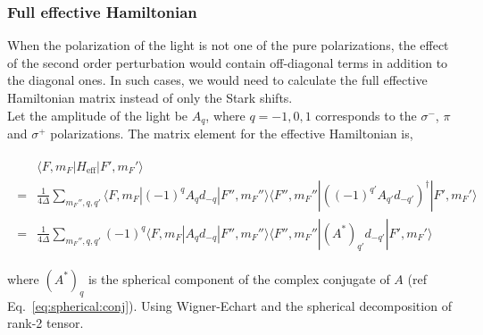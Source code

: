 \documentclass[10pt,fleqn]{article}
\newcommand{\eqar}[1]
{
  \begin{align}
    #1
  \end{align}
}
\begin{document}
\subsubsection{Full effective Hamiltonian}\label{full-effective-explicit}
When the polarization of the light is not one of the pure polarizations,
the effect of the second order perturbation would contain off-diagonal terms in addition
to the diagonal ones. In such cases, we would need to calculate the full effective
Hamiltonian matrix instead of only the Stark shifts.\\

Let the amplitude of the light be $A_q$, where $q=-1,0,1$ corresponds to the $\sigma^-$, $\pi$ and $\sigma^+$ polarizations. The matrix element for the effective Hamiltonian is,

\eqar{
  \begin{split}
    &\langle F,m_F|H_{\mathrm{eff}}|F',m_F'\rangle\\
    =&\frac{1}{4\Delta}\sum_{m_F'',q,q'}\langle F,m_F|(-1)^qA_{q}d_{-q}|F'',m_F''\rangle\langle F'',m_F''|((-1)^{q'}A_{q'}d_{-q'})^\dagger|F',m_F'\rangle\\
    =&\frac{1}{4\Delta}\sum_{m_F'',q,q'}(-1)^q\langle F,m_F|A_{q}d_{-q}|F'',m_F''\rangle\langle F'',m_F''|(A^*)_{q'}d_{-q'}|F',m_F'\rangle
  \end{split}
}
where $(A^*)_{q}$ is the spherical component of the complex conjugate of $A$ (ref Eq.~\ref{eq:spherical:conj}). Using Wigner-Echart and the spherical decomposition of rank-2 tensor.
\end{document}
